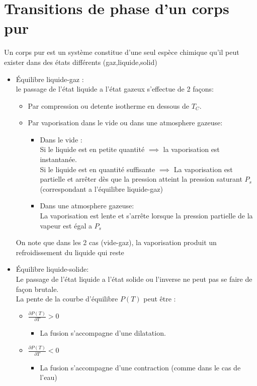 \documentclass[12pt,oneside]{book}
\begin{document}
\section{Transitions de phase d'un corps pur}
Un corps pur est un système constitue d'une seul espèce chimique qu'il peut exister dans des états différents (gaz,liquide,solid)
\begin{itemize}
    \item Équilibre liquide-gaz :\\
          le passage de l’état liquide a l’état gazeux s'effectue de 2 façons:
          \begin{itemize}
              \item Par compression ou detente isotherme en dessous de $T_C$.
              \item Par vaporisation dans le vide ou dans une atmosphere gazeuse:
                    \begin{itemize}
                        \item Dans le vide :\\
                              Si le liquide est en petite quantité $\implies$ la vaporisation est instantanée.\\
                              Si le liquide est en quantité suffisante $\implies$ La vaporisation est partielle et arrêter dès que la pression atteint la pression saturant $P_s$(correspondant a l’équilibre liquide-gaz)
                        \item Dans une atmosphere gazeuse: \\
                              La vaporisation est lente et s’arrête lorsque la pression partielle de la vapeur est égal a $P_s$
                    \end{itemize}
          \end{itemize}
          On note que dans les 2 cas (vide-gaz), la vaporisation produit un refroidissement du liquide qui reste
    \item Équilibre liquide-solide:\\
          Le passage de l’état liquide a l’état solide ou l'inverse ne peut pas se faire de façon brutale.\\
          La pente de la courbe d’équilibre $P(T)$ peut être :
          \begin{itemize}
              \item $\frac{\partial P(T)}{\partial T} > 0 $
                    \begin{itemize}
                        \item La fusion s'accompagne d'une dilatation.
                    \end{itemize}
              \item $\frac{\partial P(T)}{\partial T} < 0$
                    \begin{itemize}
                        \item La fusion s'accompagne d'une contraction (comme dans le cas de l'eau)
                    \end{itemize}
          \end{itemize}
\end{itemize}
\end{document}
